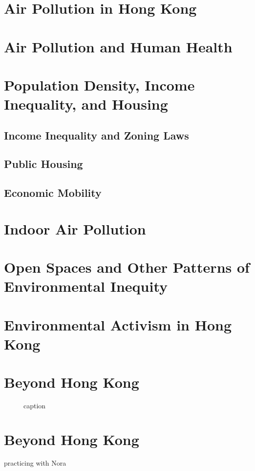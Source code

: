 \documentclass{book}\usepackage{knitr}
\begin{document}
{\section{Air Pollution in Hong Kong}
\section{Air Pollution and Human Health}
\section{Population Density, Income Inequality, and Housing}
\subsection{Income Inequality and Zoning Laws}
\subsection{Public Housing}
\subsection{Economic Mobility}
\section{Indoor Air Pollution}
\section{Open Spaces and Other Patterns of Environmental Inequity}
\section{Environmental Activism in Hong Kong}

\section{Beyond Hong Kong}

\begin{figure}
\caption{caption}
\label{title}
\end{figure}

\section{Beyond Hong Kong}

practicing with Nora


}
\end{document}
